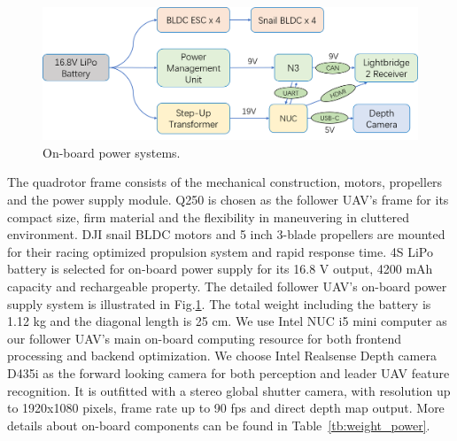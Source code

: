 \begin{table}[htb]
  \centering
  \caption{Weight and power consumption of components on the follower UAV.}
  \label{tb:weight_power}
\end{table}

\begin{figure}[ht]
  \centering
  \includegraphics[width=1.0\textwidth]{figure/chapter_4/power_system.png}
  \caption{On-board power systems.}
  \label{fig:power_systems}
\end{figure}

The quadrotor frame consists of the mechanical construction, motors, propellers and the power supply module. Q250 is chosen as the follower UAV's frame for its compact size, firm material and the flexibility in maneuvering in cluttered environment. DJI snail BLDC motors and 5 inch 3-blade propellers are mounted for their racing optimized propulsion system and rapid response time. 4S LiPo battery is selected for on-board power supply for its 16.8 V output, 4200 mAh capacity and rechargeable property. The detailed follower UAV's on-board power supply system is illustrated in Fig.\ref{fig:power_systems}. The total weight including the battery is 1.12 kg and the diagonal length is 25 cm. We use Intel NUC i5 mini computer as our follower UAV's main on-board computing resource for both frontend processing and backend optimization. We choose Intel Realsense Depth camera D435i as the forward looking camera for both perception and leader UAV feature recognition. It is outfitted with a stereo global shutter camera, with resolution up to 1920x1080 pixels, frame rate up to 90 fps and direct depth map output. More details about on-board components can be found in Table~\ref{tb:weight_power}.

